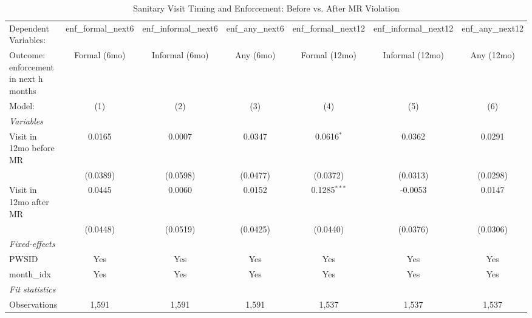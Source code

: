 \begin{table}[htbp]
\caption{\label{tab:visit_to_enf_timing} Sanitary Visit Timing and Enforcement: Before vs. After MR Violation}
\bigskip
\centering
\begin{adjustbox}{width = \textwidth, center}
\begingroup
\centering
\begin{tabular}{lcccccc}
   \tabularnewline \midrule \midrule
   Dependent Variables:                  & enf\_formal\_next6   & enf\_informal\_next6   & enf\_any\_next6   & enf\_formal\_next12   & enf\_informal\_next12   & enf\_any\_next12\\    
   Outcome: enforcement in next h months & Formal (6mo)         & Informal (6mo)         & Any (6mo)         & Formal (12mo)         & Informal (12mo)         & Any (12mo) \\   
   Model:                                & (1)                  & (2)                    & (3)               & (4)                   & (5)                     & (6)\\  
   \midrule
   \emph{Variables}\\
   Visit in 12mo before MR               & 0.0165               & 0.0007                 & 0.0347            & 0.0616$^{*}$          & 0.0362                  & 0.0291\\   
                                         & (0.0389)             & (0.0598)               & (0.0477)          & (0.0372)              & (0.0313)                & (0.0298)\\   
   Visit in 12mo after MR                & 0.0445               & 0.0060                 & 0.0152            & 0.1285$^{***}$        & -0.0053                 & 0.0147\\   
                                         & (0.0448)             & (0.0519)               & (0.0425)          & (0.0440)              & (0.0376)                & (0.0306)\\   
   \midrule
   \emph{Fixed-effects}\\
   PWSID                                 & Yes                  & Yes                    & Yes               & Yes                   & Yes                     & Yes\\  
   month\_idx                            & Yes                  & Yes                    & Yes               & Yes                   & Yes                     & Yes\\  
   \midrule
   \emph{Fit statistics}\\
   Observations                          & 1,591                & 1,591                  & 1,591             & 1,537                 & 1,537                   & 1,537\\  

\end{tabular}
\end{adjustbox}
\end{table}
